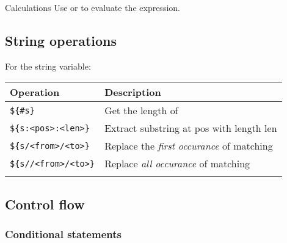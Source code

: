 \documentclass{article}
\begin{document}
\begin{knBox}
    {Calculations}
    Use  or  to evaluate the expression.
\end{knBox}

\subsection{String operations}
For the  string variable:
\begin{table}[H]
    \begin{tabular}{ll}
        \textbf{Operation}            & \textbf{Description}                                        \\ \hline
        \lstinline|${#s}|             & Get the length of \Colorbox{superlightgray}{\lstinline|$s|} \\ \arrayrulecolor{lightgray}\hline
        \lstinline|${s:<pos>:<len>}|  & Extract substring at pos with length len                    \\ \arrayrulecolor{lightgray}\hline
        \lstinline|${s/<from>/<to>}|  & Replace the \emph{first occurance} of matching              \\ \arrayrulecolor{lightgray}\hline
        \lstinline|${s//<from>/<to>}| & Replace \emph{all occurance} of matching                    \\ \arrayrulecolor{lightgray}\hline
    \end{tabular}
\end{table}

\subsection{Control flow}

\subsubsection{Conditional statements}

\end{document}
